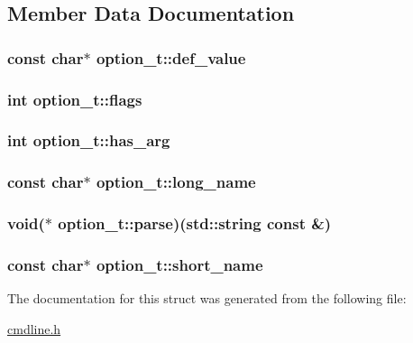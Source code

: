 \subsection{Member Data Documentation}
\hypertarget{structoption__t_a7c8c8055faed271cb82427677e40c6a2}{
\subsubsection[{def\-\_\-value}]{\setlength{\rightskip}{0pt plus 5cm}const char$\ast$ {\bf option\-\_\-t\-::def\-\_\-value}}}\label{structoption__t_a7c8c8055faed271cb82427677e40c6a2}
\hypertarget{structoption__t_af9aedcd1623bae58760de4de2ce99234}{
\subsubsection[{flags}]{\setlength{\rightskip}{0pt plus 5cm}int {\bf option\-\_\-t\-::flags}}}\label{structoption__t_af9aedcd1623bae58760de4de2ce99234}
\hypertarget{structoption__t_a8479bb3922ab98a96bd7c371add56d1a}{
\subsubsection[{has\-\_\-arg}]{\setlength{\rightskip}{0pt plus 5cm}int {\bf option\-\_\-t\-::has\-\_\-arg}}}\label{structoption__t_a8479bb3922ab98a96bd7c371add56d1a}
\hypertarget{structoption__t_a5932f4026fec602c6d0b31178177a51e}{
\subsubsection[{long\-\_\-name}]{\setlength{\rightskip}{0pt plus 5cm}const char$\ast$ {\bf option\-\_\-t\-::long\-\_\-name}}}\label{structoption__t_a5932f4026fec602c6d0b31178177a51e}
\hypertarget{structoption__t_a1329dfa63fabe96e7a2b00b254b3d17a}{
\subsubsection[{parse}]{\setlength{\rightskip}{0pt plus 5cm}void($\ast$ {\bf option\-\_\-t\-::parse})(std\-::string const \&)}}\label{structoption__t_a1329dfa63fabe96e7a2b00b254b3d17a}
\hypertarget{structoption__t_a5932f8523cf09216fe3522b12b87c435}{
\subsubsection[{short\-\_\-name}]{\setlength{\rightskip}{0pt plus 5cm}const char$\ast$ {\bf option\-\_\-t\-::short\-\_\-name}}}\label{structoption__t_a5932f8523cf09216fe3522b12b87c435}


The documentation for this struct was generated from the following file\-:\begin{DoxyCompactItemize}
\item 
\hyperlink{cmdline_8h}{cmdline.\-h}\end{DoxyCompactItemize}
